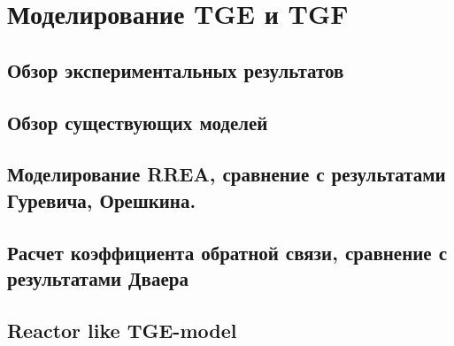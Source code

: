 \chapter{Моделирование TGE и TGF
}\label{ch:thunderstorm}

\section{Обзор экспериментальных результатов
}\label{sec:thunderstorm/review-exp}

\section{Обзор существующих моделей}\label{sec:thunderstorm/review-mod}

\section{Моделирование RREA, сравнение с результатами Гуревича, Орешкина.}\label{sec:thunderstorm/rrea}
\section{Расчет коэффициента обратной связи, сравнение с результатами Дваера}\label{sec:thunderstorm/rdfm}
\section{Reactor like TGE-model}\label{sec:thunderstorm/reactor}
\clearpage